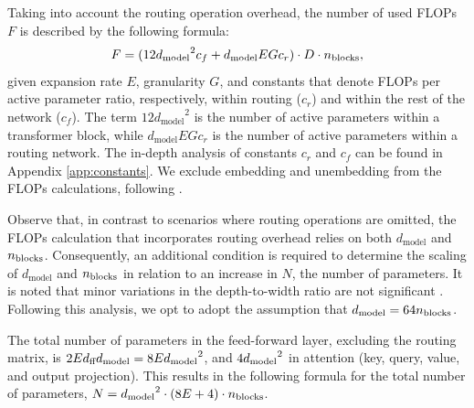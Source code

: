 Taking into account the routing operation overhead, the number of used FLOPs $F$ is described by the following formula:
\begin{align}
    F = (12{d_\text{model}}^2c_f + d_\text{model} EGc_r) \cdot D \cdot n_\text{blocks},
    \label{eq:flops}
\end{align}
given expansion rate $E$, granularity $G$, and constants that denote FLOPs per active parameter ratio, respectively, within routing ($c_r$) and within the rest of the network ($c_f$). The term $12{d_{\text{model}}}^2$ is the number of active parameters within a transformer block, while $d_{\text{model}}EGc_r$ is the number of active parameters within a routing network. The in-depth analysis of constants $c_r$ and $c_f$ can be found in Appendix
\ref{app:constants}. We exclude embedding and unembedding from the FLOPs calculations, following \cite{hoffmann2022training}.

Observe that, in contrast to scenarios where routing operations are omitted, the FLOPs calculation that incorporates routing overhead relies on both $d_{\text{model}}$ and $n_\text{blocks}$. Consequently, an additional condition is required to determine the scaling of $d_{\text{model}}$ and $n_\text{blocks}$ in relation to an increase in $N$, the number of parameters. It is noted that minor variations in the depth-to-width ratio are not significant \citep{kaplan2020scaling}. Following this analysis, we opt to adopt the assumption that $d_\text{model}=64n_\text{blocks}$.

The total number of parameters in the feed-forward layer, excluding the routing matrix, is $2Ed_\text{ff} d_{\text{model}} = 8E{d_\text{model}}^2$, and $4{d_\text{model}}^2$ in attention (key, query, value, and output projection). This results in the following formula for the total number of parameters, $N = {d_\text{model}}^2 \cdot (8E + 4) \cdot n_\text{blocks}$.






